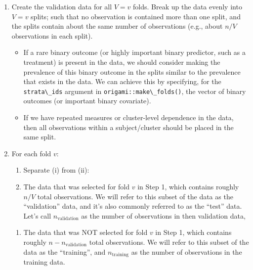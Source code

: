 \documentclass[12pt, krantz2,]{krantz}
\newcommand{\passthrough}[1]{#1}
\providecommand{\tightlist}{%
  \setlength{\itemsep}{0pt}\setlength{\parskip}{0pt}}
\theoremstyle{definition}
\theoremstyle{definition}
\theoremstyle{definition}
\newcommand{\1}{\mathbbm{1}}
\begin{document}
\begin{enumerate}
\def\labelenumi{\arabic{enumi}.}
\item
  Create the validation data for all \(V=v\) folds. Break up the data evenly
  into \(V=v\) splits; such that no observation is contained more than one split,
  and the splits contain about the same number of observations (e.g., about
  \(n/V\) observations in each split).

  \begin{itemize}
  \tightlist
  \item
    If a rare binary outcome (or highly important binary predictor, such as
    a treatment) is present in the data, we should consider making the
    prevalence of this binary outcome in the splits similar to the
    prevalence that exists in the data. We can achieve this by specifying,
    for the \passthrough{\lstinline!strata\_ids!} argument in \passthrough{\lstinline!origami::make\_folds()!}, the vector of
    binary outcomes (or important binary covariate).
  \item
    If we have repeated measures or cluster-level dependence in the data,
    then all observations within a subject/cluster should be placed in the
    same split.
  \end{itemize}
\item
  For each fold \(v\):

  \begin{enumerate}
  \def\labelenumii{\alph{enumii}.}
  \item
    Separate (i) from (ii):
  \item
    The data that was selected for fold \(v\) in Step 1, which contains
    roughly \(n/V\) total observations. We will refer to this subset of the
    data as the ``validation'' data, and it's also commonly referred to as
    the ``test'' data. Let's call \(n_{\text{validation}}\) as the number of
    observations in then validation data,
  \end{enumerate}

  \begin{enumerate}
  \def\labelenumii{\roman{enumii}.}
  \setcounter{enumii}{1}
  \tightlist
  \item
    The data that was NOT selected for fold \(v\) in Step 1, which contains
    roughly \(n - n_{\text{validation}}\) total observations. We will refer
    to this subset of the data as the ``training'', and
    \(n_{\text{training}}\) as the number of observations in the training
    data.
  \end{enumerate}


\end{enumerate}
\end{document}
